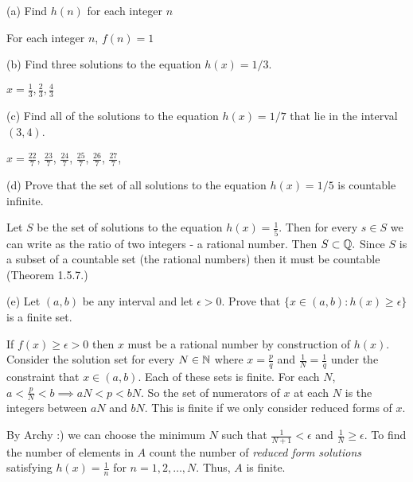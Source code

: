 \documentclass{report}
\begin{document}
\bigskip
(a) Find $h(n)$ for each integer $n$

\sol For each integer $n$, $f(n)=1$
\bigskip

(b) Find three solutions to the equation $h(x)=1 / 3$.

\sol $ x = \frac{1}{3}, \frac{2}{3}, \frac{4}{3}$

\bigskip
(c) Find all of the solutions to the equation $h(x)=1 / 7$ that lie in the interval $(3,4)$.

\sol $x = \frac{22}{7}$, $\frac{23}{7}$, $\frac{24}{7}$, $\frac{25}{7}$, $\frac{26}{7}$, $\frac{27}{7}$,

\bigskip
(d) Prove that the set of all solutions to the equation $h(x)=1 / 5$ is countable infinite.

\sol
\begin{myproof}
    Let $S$ be the set of solutions to the equation $h(x)= \frac{1}{5}.$ Then for every $s \in S$ we can write as the ratio of two integers - a rational number. Then $S \subset \QQ.$ Since $S$ is a subset of a countable set (the rational numbers) then it must be countable (Theorem 1.5.7.) 
\end{myproof}
\bigskip
(e) Let $(a, b)$ be any interval and let $\epsilon>0$. Prove that $\{x \in(a, b): h(x) \geq \epsilon\}$ is a finite set.
\par
\bigskip
\sol
If $f(x) \geq \epsilon > 0$ then $x$ must be a rational number by construction of $h(x).$  Consider the solution set for every $N\in \NN$ where $x = \frac{p}{q}$ and $\frac{1}{N} = \frac{1}{q}$ under the constraint that $x \in (a,b)$.  Each of these sets is finite. For each $N$, $ a < \frac{p}{N} < b \implies aN < p < bN.$ So the set of numerators of $x$ at each $N$ is the integers between $aN$ and $bN.$ This is finite if we only consider reduced forms of $x.$

By Archy :) we can choose the minimum $N$ such that $\frac{1}{N+1} < \epsilon$ and $\frac{1}{N} \geq \epsilon.$ To find the number of elements in $A$ count the number of \textit{reduced form solutions} satisfying $h(x) = \frac{1}{n}$ for $n = 1,2,\dots, N$. Thus, $A$ is finite.

\pagebreak
{}
\end{document}
